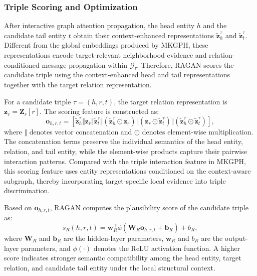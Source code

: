 \documentclass[a4paper,fleqn]{cas-sc}
\begin{document}
\subsubsection{Triple Scoring and Optimization}

After interactive graph attention propagation, the head entity $h$ and the candidate tail entity $t$ obtain their context-enhanced representations $\widetilde{\mathbf{z}}_{h}^{\tau}$ and $\widetilde{\mathbf{z}}_{t}^{\tau}$. Different from the global embeddings produced by MKGPH, these representations encode target-relevant neighborhood evidence and relation-conditioned message propagation within $\mathcal{G}_{\tau}$. Therefore, RAGAN scores the candidate triple using the context-enhanced head and tail representations together with the target relation representation.

For a candidate triple $\tau=(h,r,t)$, the target relation representation is $\mathbf{z}_{r}=\mathbf{Z}_{r}[r]$. The scoring feature is constructed as:
\begin{equation}
\mathbf{o}_{h,r,t}
=
\left[
\widetilde{\mathbf{z}}_{h}^{\tau}
\Vert
\mathbf{z}_{r}
\Vert
\widetilde{\mathbf{z}}_{t}^{\tau}
\Vert
\left(
\widetilde{\mathbf{z}}_{h}^{\tau}
\odot
\mathbf{z}_{r}
\right)
\Vert
\left(
\mathbf{z}_{r}
\odot
\widetilde{\mathbf{z}}_{t}^{\tau}
\right)
\Vert
\left(
\widetilde{\mathbf{z}}_{h}^{\tau}
\odot
\widetilde{\mathbf{z}}_{t}^{\tau}
\right)
\right],
\end{equation}
where $\Vert$ denotes vector concatenation and $\odot$ denotes element-wise multiplication. The concatenation terms preserve the individual semantics of the head entity, relation, and tail entity, while the element-wise products capture their pairwise interaction patterns. Compared with the triple interaction feature in MKGPH, this scoring feature uses entity representations conditioned on the context-aware subgraph, thereby incorporating target-specific local evidence into triple discrimination.

Based on $\mathbf{o}_{h,r,t}$, RAGAN computes the plausibility score of the candidate triple as:
\begin{equation}
s_{R}(h,r,t)
=
\mathbf{w}_{R}^{\top}
\phi
\left(
\mathbf{W}_{R}
\mathbf{o}_{h,r,t}
+
\mathbf{b}_{R}
\right)
+
b_{R},
\end{equation}
where $\mathbf{W}_{R}$ and $\mathbf{b}_{R}$ are the hidden-layer parameters, $\mathbf{w}_{R}$ and $b_{R}$ are the output-layer parameters, and $\phi(\cdot)$ denotes the ReLU activation function. A higher score indicates stronger semantic compatibility among the head entity, target relation, and candidate tail entity under the local structural context.
\end{document}
